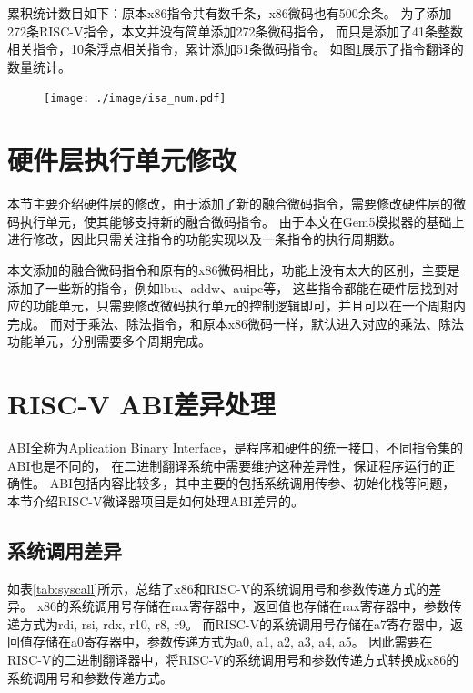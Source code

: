 累积统计数目如下：原本x86指令共有数千条，x86微码也有500余条。
为了添加272条RISC-V指令，本文并没有简单添加272条微码指令，
而只是添加了41条整数相关指令，10条浮点相关指令，累计添加51条微码指令。
如图\ref{img:isa_num}展示了指令翻译的数量统计。


\begin{figure}[!htbp]
  \centering
  \texttt{[image: ./image/isa\_num.pdf]}
  \label{img:isa_num}
\end{figure}

\section{硬件层执行单元修改}

本节主要介绍硬件层的修改，由于添加了新的融合微码指令，需要修改硬件层的微码执行单元，使其能够支持新的融合微码指令。
由于本文在Gem5模拟器的基础上进行修改，因此只需关注指令的功能实现以及一条指令的执行周期数。

本文添加的融合微码指令和原有的x86微码相比，功能上没有太大的区别，主要是添加了一些新的指令，例如lbu、addw、auipc等，
这些指令都能在硬件层找到对应的功能单元，只需要修改微码执行单元的控制逻辑即可，并且可以在一个周期内完成。
而对于乘法、除法指令，和原本x86微码一样，默认进入对应的乘法、除法功能单元，分别需要多个周期完成。


\section{RISC-V ABI差异处理}
ABI全称为Aplication Binary Interface，是程序和硬件的统一接口，不同指令集的ABI也是不同的，
在二进制翻译系统中需要维护这种差异性，保证程序运行的正确性。
ABI包括内容比较多，其中主要的包括系统调用传参、初始化栈等问题，本节介绍RISC-V微译器项目是如何处理ABI差异的。


\subsection{系统调用差异}

如表\ref{tab:syscall}所示，总结了x86和RISC-V的系统调用号和参数传递方式的差异。
x86的系统调用号存储在rax寄存器中，返回值也存储在rax寄存器中，参数传递方式为rdi, rsi, rdx, r10, r8, r9。
而RISC-V的系统调用号存储在a7寄存器中，返回值存储在a0寄存器中，参数传递方式为a0, a1, a2, a3, a4, a5。
因此需要在RISC-V的二进制翻译器中，将RISC-V的系统调用号和参数传递方式转换成x86的系统调用号和参数传递方式。

